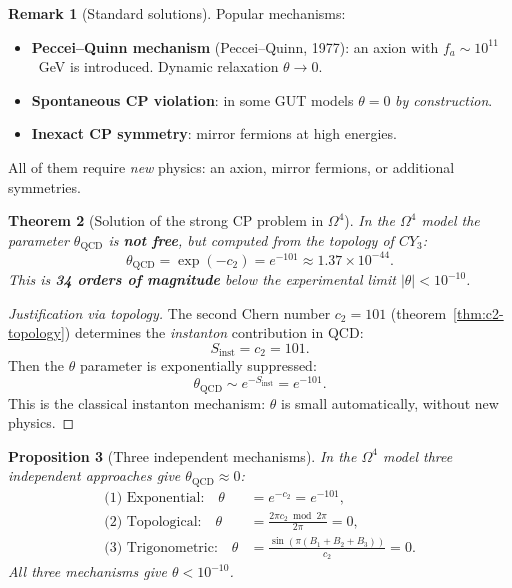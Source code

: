 \documentclass[11pt,a4paper]{article}
\newcommand{\Om}{\ensuremath{\Omega^4}}
\newtheorem{theorem}{Theorem}[section]
\newtheorem{proposition}[theorem]{Proposition}
\theoremstyle{definition}
\newtheorem{remark}[theorem]{Remark}
\begin{document}
\begin{remark}[Standard solutions]
\label{rem:standard-solutions}
Popular mechanisms:
\begin{itemize}
    \item \textbf{Peccei--Quinn mechanism} (Peccei--Quinn, 1977):
          an axion with $f_a \sim 10^{11}$~GeV is introduced. Dynamic
          relaxation $\theta \to 0$.
    \item \textbf{Spontaneous CP violation}: in some GUT models
          $\theta = 0$ \emph{by construction}.
    \item \textbf{Inexact CP symmetry}: mirror fermions at high
          energies.
\end{itemize}
All of them require \emph{new} physics: an axion, mirror fermions,
or additional symmetries.
\end{remark}

\begin{theorem}[Solution of the strong CP problem in $\Om$]
\label{thm:strong-cp-solution}
In the $\Omega^4$ model the parameter $\theta_{\text{QCD}}$ is \textbf{not free}, but
\emph{computed} from the topology of $CY_3$:
\begin{equation}
    \boxed{
    \theta_{\text{QCD}} = \exp(-c_2) = e^{-101} \approx 1.37 \times 10^{-44}.
    }
    \label{eq:theta-solution}
\end{equation}
This is \textbf{34 orders of magnitude} below the experimental limit
$|\theta| < 10^{-10}$.
\end{theorem}

\begin{proof}[Justification via topology]
The second Chern number $c_2 = 101$ (theorem~\ref{thm:c2-topology})
determines the \emph{instanton} contribution in QCD:
\begin{equation}
    S_{\text{inst}} = c_2 = 101.
\end{equation}
Then the $\theta$ parameter is exponentially suppressed:
\begin{equation}
    \theta_{\text{QCD}} \sim e^{-S_{\text{inst}}} = e^{-101}.
\end{equation}
This is the classical instanton mechanism: $\theta$ is small automatically,
without new physics.
\end{proof}

\begin{proposition}[Three independent mechanisms]
\label{prop:three-mechanisms}
In the $\Om$ model three independent approaches give $\theta_{\text{QCD}} \approx 0$:
\begin{align}
    \text{(1) Exponential:} \quad
    \theta &= e^{-c_2} = e^{-101}, \\
    \text{(2) Topological:} \quad
    \theta &= \frac{2\pi c_2 \bmod 2\pi}{2\pi} = 0, \\
    \text{(3) Trigonometric:} \quad
    \theta &= \frac{\sin(\pi (B_1 + B_2 + B_3))}{c_2} = 0.
\end{align}
All three mechanisms give $\theta < 10^{-10}$.
\end{proposition}
\end{document}
